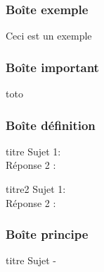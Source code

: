 \documentclass[b,e,cours]{D:/Dropbox/enseignement/CPGE/raphaelpoiree/paquets/classe_kara}
\begin{document}
\subsubsection{Boîte exemple}
\begin{frame}
\begin{exemple}{\null}
Ceci est un exemple
\end{exemple}

\end{frame}

\subsubsection{Boîte important}
\begin{frame}
\begin{important}{\null}
toto
\end{important}
\end{frame}

\subsubsection{Boîte définition}
\begin{frame}
\begin{madefinition}{titre}
Sujet 1:\\
Réponse 2 : 
\end{madefinition}
\end{frame}

\begin{frame}
\begin{madefinition}{titre2}
Sujet 1:\\
Réponse 2 : 
\end{madefinition}
\end{frame}
\subsubsection{Boîte principe}
\begin{frame}
\begin{monprincipe}{titre}
Sujet - \\
\end{monprincipe}
\end{frame}
\end{document}
